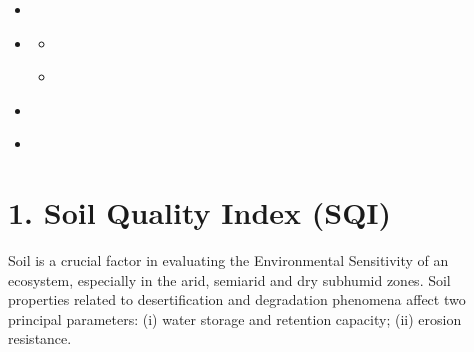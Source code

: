 \documentclass[letterpaper,10pt,english]{sphinxmanual}
\begin{document}
\begin{sphinxShadowBox}
\begin{itemize}
\begin{itemize}
\begin{itemize}
\begin{itemize}
\end{itemize}

\end{itemize}

\item {} 
\sphinxAtStartPar
{}\label{\detokenize{Qgis_Plugin/Calculate_medalus:id10}}{\hyperref[\detokenize{Qgis_Plugin/Calculate_medalus:vegetation-quality-index-vqi}]{}}

\item {} 
\sphinxAtStartPar
{}\label{\detokenize{Qgis_Plugin/Calculate_medalus:id11}}{\hyperref[\detokenize{Qgis_Plugin/Calculate_medalus:climate-quality-index-cqi}]{}}
\begin{itemize}
\item {} 
\sphinxAtStartPar
{}\label{\detokenize{Qgis_Plugin/Calculate_medalus:id12}}{\hyperref[\detokenize{Qgis_Plugin/Calculate_medalus:id1}]{}}

\item {} 
\sphinxAtStartPar
{}\label{\detokenize{Qgis_Plugin/Calculate_medalus:id13}}{\hyperref[\detokenize{Qgis_Plugin/Calculate_medalus:id2}]{}}

\end{itemize}

\item {} 
\sphinxAtStartPar
{}\label{\detokenize{Qgis_Plugin/Calculate_medalus:id14}}{\hyperref[\detokenize{Qgis_Plugin/Calculate_medalus:management-quality-index-mqi}]{}}

\item {} 
\sphinxAtStartPar
{}\label{\detokenize{Qgis_Plugin/Calculate_medalus:id15}}{\hyperref[\detokenize{Qgis_Plugin/Calculate_medalus:environmentally-sensitive-area-esa-index-combined-desertification-layer}]{}}

\end{itemize}

\end{itemize}
\end{sphinxShadowBox}


\section{1. Soil Quality Index (SQI)}
\label{\detokenize{Qgis_Plugin/Calculate_medalus:soil-quality-index-sqi}}
\sphinxAtStartPar
Soil is a crucial factor in evaluating the Environmental Sensitivity of an ecosystem, especially in the arid,
semi\sphinxhyphen{}arid and dry sub\sphinxhyphen{}humid zones. Soil properties related to desertification and degradation phenomena affect two principal parameters:
(i) water storage and retention capacity;
(ii) erosion resistance.
\end{document}
